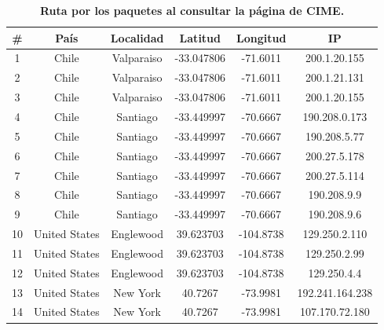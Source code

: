 \documentclass[12pt]{article}
\begin{document}
\begin{table}[H]
\centering
\begin{tabular}{| c | c | c | c | c | c |}
\hline
\# & País & Localidad & Latitud & Longitud & IP\\
\hline
1 & Chile & Valparaiso & -33.047806 & -71.6011 & 200.1.20.155\\
\hline
2 & Chile & Valparaiso & -33.047806 & -71.6011 & 200.1.21.131\\
\hline
3 & Chile & Valparaiso & -33.047806 & -71.6011 & 200.1.20.155\\
\hline
4 & Chile & Santiago & -33.449997 & -70.6667 & 190.208.0.173\\
\hline
5 & Chile & Santiago & -33.449997 & -70.6667 & 190.208.5.77\\
\hline
6 & Chile & Santiago & -33.449997 & -70.6667 & 200.27.5.178\\
\hline
7 & Chile & Santiago & -33.449997 & -70.6667 & 200.27.5.114\\
\hline
8 & Chile & Santiago & -33.449997 & -70.6667 & 190.208.9.9\\
\hline
9 & Chile & Santiago & -33.449997 & -70.6667 & 190.208.9.6\\
\hline
10 & United States & Englewood & 39.623703 & -104.8738 & 129.250.2.110\\
\hline
11 & United States & Englewood & 39.623703 & -104.8738 & 129.250.2.99\\
\hline
12 & United States & Englewood & 39.623703 & -104.8738 & 129.250.4.4\\
\hline
13 & United States & New York & 40.7267 & -73.9981 & 192.241.164.238\\
\hline
14 & United States & New York & 40.7267 & -73.9981 & 107.170.72.180\\
\hline
\end{tabular}
\caption{\small \textbf{Ruta por los paquetes al consultar la página de CIME.}}
\end{table}
\end{document}

